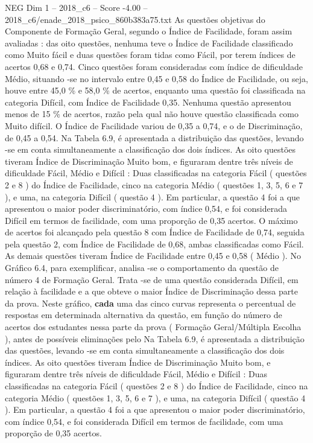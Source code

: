 \begin{textsample}{NEG Dim 1 – 2018\_c6 – Score -4.00 – 2018\_c6/enade\_2018\_psico\_860b383a75.txt}
As questões objetivas do Componente de Formação Geral, segundo o Índice de Facilidade, foram assim avaliadas : das oito questões, nenhuma teve o Índice de Facilidade classificado como Muito fácil e duas questões foram tidas como Fácil, por terem índices de acertos 0,68 e 0,74.
Cinco questões foram consideradas com índice de dificuldade Médio, situando -se no intervalo entre 0,45 e 0,58 do Índice de Facilidade, ou seja, houve entre 45,0 \% e 58,0 \% de acertos, enquanto uma questão foi classificada na categoria Difícil, com Índice de Facilidade 0,35.
Nenhuma questão apresentou menos de 15 \% de acertos, razão pela qual não houve questão classificada como Muito difícil.
O Índice de Facilidade variou de 0,35 a 0,74, e o de Discriminação, de 0,45 a 0,54.
Na Tabela 6.9, é apresentada a distribuição das questões, levando -se em conta simultaneamente a classificação dos dois índices.
As oito questões tiveram Índice de Discriminação Muito bom, e figuraram dentre três níveis de dificuldade Fácil, Médio e Difícil : Duas classificadas na categoria Fácil ( questões 2 e 8 ) do Índice de Facilidade, cinco na categoria Médio ( questões 1, 3, 5, 6 e 7 ), e uma, na categoria Difícil ( questão 4 ).
Em particular, a questão 4 foi a que apresentou o maior poder discriminatório, com índice 0,54, e foi considerada Difícil em termos de facilidade, com uma proporção de 0,35 acertos.
O máximo de acertos foi alcançado pela questão 8 com Índice de Facilidade de 0,74, seguida pela questão 2, com Índice de Facilidade de 0,68, ambas classificadas como Fácil.
As demais questões tiveram Índice de Facilidade entre 0,45 e 0,58 ( Médio ).
No Gráfico 6.4, para exemplificar, analisa -se o comportamento da questão de número 4 de Formação Geral.
Trata -se de uma questão considerada Difícil, em relação à facilidade e a que obteve o maior Índice de Discriminação dessa parte da prova.
Neste gráfico, \textbf{cada} uma das cinco curvas representa o percentual de respostas em determinada alternativa da questão, em função do número de acertos dos estudantes nessa parte da prova ( Formação Geral/Múltipla Escolha ), antes de possíveis eliminações pelo Na Tabela 6.9, é apresentada a distribuição das questões, levando -se em conta simultaneamente a classificação dos dois índices.
As oito questões tiveram Índice de Discriminação Muito bom, e figuraram dentre três níveis de dificuldade Fácil, Médio e Difícil : Duas classificadas na categoria Fácil ( questões 2 e 8 ) do Índice de Facilidade, cinco na categoria Médio ( questões 1, 3, 5, 6 e 7 ), e uma, na categoria Difícil ( questão 4 ).
Em particular, a questão 4 foi a que apresentou o maior poder discriminatório, com índice 0,54, e foi considerada Difícil em termos de facilidade, com uma proporção de 0,35 acertos.

\end{textsample}
